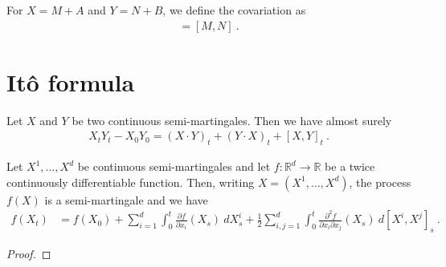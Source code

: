 For $X = M + A$ and $Y = N + B$, we define the covariation as
\begin{align*}
  [X, Y] = [M, N]
  \: .
\end{align*}

\section{Itô formula}


\begin{theorem}\label{thm:integration_by_parts}
Let $X$ and $Y$ be two continuous semi-martingales. Then we have almost surely
\begin{align*}
  X_t Y_t - X_0 Y_0
  = (X \cdot Y)_t + (Y \cdot X)_t + [X,Y]_t
  \: .
\end{align*}
\end{theorem}




\begin{theorem}\label{thm:Ito_formula}
Let $X^1, \ldots, X^d$ be continuous semi-martingales and let $f : \mathbb{R}^d \to \mathbb{R}$ be a twice continuously differentiable function.
Then, writing $X = (X^1, \ldots, X^d)$, the process $f(X)$ is a semi-martingale and we have
\begin{align*}
  f(X_t)
  &= f(X_0)
  + \sum_{i=1}^d \int_0^t \frac{\partial f}{\partial x_i}(X_s) \: dX^i_s
  + \frac{1}{2} \sum_{i,j=1}^d \int_0^t \frac{\partial^2 f}{\partial x_i \partial x_j}(X_s) \: d[X^i, X^j]_s
  \: .
\end{align*}
\end{theorem}

\begin{proof}

\end{proof}
